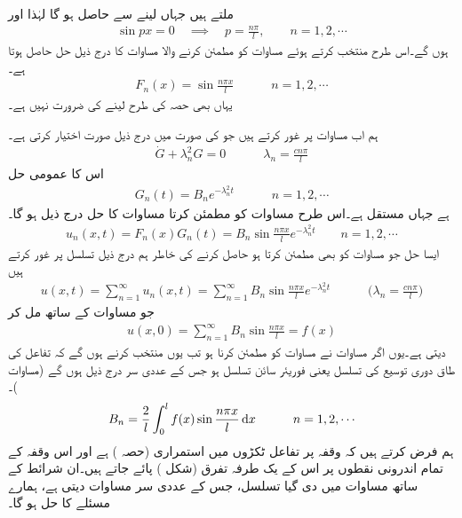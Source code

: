ملتے ہیں جہاں  لینے سے  حاصل ہو گا لہٰذا  اور 
\begin{align*}
\sin px=0\quad \implies \quad p=\frac{n\pi}{l}, \quad \quad n=1,2,\cdots 
\end{align*}
ہوں گے۔اس طرح  منتخب  کرتے ہوئے مساوات  کو مطمئن کرنے والا مساوات  کا درج ذیل حل  حاصل ہوتا ہے۔
\begin{align*}
F_n(x)=\sin \frac{n\pi x}{l}\quad \quad \quad n=1,2,\cdots
\end{align*}
یہاں بھی حصہ  کی طرح  لینے کی ضرورت نہیں ہے۔

ہم اب مساوات  پر غور کرتے ہیں جو  کی صورت میں درج ذیل صورت اختیار کرتی ہے۔
\begin{align*}
\dot{G}+\lambda_n^2G=0\quad \quad \quad \lambda_n=\frac{cn\pi}{l}
\end{align*}
اس کا عمومی حل
\begin{align*}
G_n(t)=B_ne^{-\lambda_n^2t}\quad \quad \quad n=1,2,\cdots
\end{align*}
ہے جہاں  مستقل ہے۔اس طرح مساوات  کو مطمئن کرتا مساوات  کا حل درج ذیل ہو گا۔
\begin{align}\label{مساوات_جزوی_حل_حرارت_ث}
u_n(x,t)=F_n(x)G_n(t)=B_n\sin\frac{n\pi x}{l}e^{-\lambda_n^2t}\quad \quad n=1,2,\cdots
\end{align}
\quad ایسا حل جو مساوات  کو بھی مطمئن کرتا ہو حاصل کرنے کی خاطر ہم درج ذیل تسلسل پر غور کرتے ہیں
\begin{align}\label{مساوات_جزوی_حل_حرارت_ج}
u(x,t)=\sum_{n=1}^{\infty} u_n(x,t)=\sum_{n=1}^{\infty}B_n\sin\frac{n\pi x}{l}e^{-\lambda_n^2t}\quad \quad\quad \big(\lambda_n=\frac{cn\pi}{l}\big)
\end{align}
جو مساوات  کے  ساتھ مل کر
\begin{align*}
u(x,0)=\sum_{n=1}^{\infty} B_n\sin\frac{n\pi x}{l}=f(x)
\end{align*}
دیتی ہے۔یوں  اگر مساوات  نے مساوات  کو مطمئن کرنا ہو تب  یوں منتخب کرنے ہوں گے کہ  تفاعل  کی طاق دوری توسیع کی تسلسل یعنی فوریئر سائن تسلسل ہو جس کے عددی سر درج ذیل ہوں گے (مساوات )۔
\begin{align}\label{مساوات_جزوی_حل_حرارت_چ}
B_n=\frac{2}{l}\int_0^l f(x)\sin\frac{n\pi x}{l}\dif x\quad \quad \quad n=1,2,\cdots
\end{align}
ہم فرض کرتے ہیں کہ وقفہ  پر تفاعل  ٹکڑوں میں استمراری (حصہ ) ہے  اور اس وقفہ کے تمام اندرونی نقطوں پر اس کے یک طرفہ تفرق (شکل ) پائے جاتے ہیں۔ان شرائط کے ساتھ مساوات  میں دی گیا تسلسل، جس کے عددی سر مساوات  دیتی ہے، ہمارے مسئلے کا حل ہو گا۔

